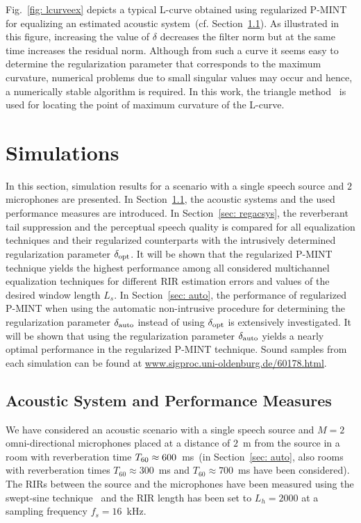 \documentclass[draftcls,onecolumn,11pt]{IEEEtran}
\begin{document}
Fig.~\ref{fig: lcurveex} depicts a typical L-curve obtained using regularized P-MINT for equalizing an estimated acoustic system~(cf. Section~\ref{sec: acsys}).
As illustrated in this figure, increasing the value of $\delta$ decreases the filter norm but at the same time increases the residual norm.
Although from such a curve it seems easy to determine the regularization parameter that corresponds to the maximum curvature, numerical problems due to small singular values may occur and hence, a numerically stable algorithm is required.
In this work, the triangle method~\cite{Castellanos_2002} is used for locating the point of maximum curvature of the L-curve.

\section{Simulations}
\label{sec: exp}

In this section, simulation results for a scenario with a single speech source and $2$ microphones are presented.
In Section~\ref{sec: acsys}, the acoustic systems and the used performance measures are introduced.
In Section~\ref{sec: regacsys}, the reverberant tail suppression and the perceptual speech quality is compared for all equalization techniques and their regularized counterparts with the intrusively determined regularization parameter $\delta_{\rm opt}$.
It will be shown that the regularized P-MINT technique yields the highest performance among all considered multichannel equalization techniques for different RIR estimation errors and values of the desired window length $L_s$.
In Section~\ref{sec: auto}, the performance of regularized P-MINT when using the automatic non-intrusive procedure for determining the regularization parameter $\delta_{\rm auto}$ instead of using $\delta_{\rm opt}$ is extensively investigated.
It will be shown that using the regularization parameter $\delta_{\rm auto}$ yields a nearly optimal performance in the regularized P-MINT technique.
Sound samples from each simulation can be found at {\small \url{www.sigproc.uni-oldenburg.de/60178.html}}.

\subsection{Acoustic System and Performance Measures}
\label{sec: acsys}

We have considered an acoustic scenario with a single speech source and $M=2$ omni-directional microphones placed at a distance of $2$~m from the source in a room with reverberation time $T_{\rm 60} \approx 600$~ms~(in Section~\ref{sec: auto}, also rooms with reverberation times $T_{60} \approx 300$~ms and $T_{60} \approx 700$~ms have been considered).
The RIRs between the source and the microphones have been measured using the swept-sine technique~\cite{Farina_2000} and the RIR length has been set to $L_h = 2000$ at a sampling frequency $f_s = 16$~kHz.
\end{document}

